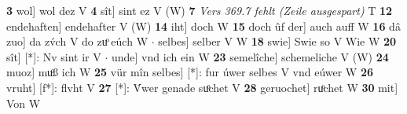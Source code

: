 \documentclass[8pt,a4paper,notitlepage]{article}
\begin{document}
\begin{table}[ht]
\begin{minipage}[t]{0.5\linewidth}
\textbf{3} wol] wol dez V \textbf{4} sît] sint ez V (W) \textbf{7} \textit{Vers 369.7 fehlt (Zeile ausgespart)} T  \textbf{12} endehaften] endehafter V (W) \textbf{14} iht] doch W \textbf{15} doch ûf der] auch auff W \textbf{16} dâ zuo] da zv́ch V do zuͦ eúch W  $\cdot$ selbes] selber V W \textbf{18} swie] Swie so V Wie W \textbf{20} sît] [*]: Nv sint ir V  $\cdot$ unde] vnd ich ein W \textbf{23} semelîche] schemeliche V (W) \textbf{24} muoz] muͦß ich W \textbf{25} vür mîn selbes] [*]: fur úwer selbes V vnd eúwer W \textbf{26} vruht] [f*]: flvht V \textbf{27} [*]: V́wer genade suͦchet V \textbf{28} geruochet] ruͦchet W \textbf{30} mit] Von W \newline
\end{minipage}
\end{table}
\end{document}
